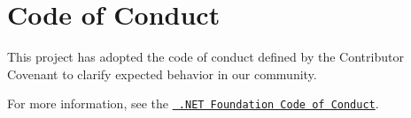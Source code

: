 \chapter{Code of Conduct}
\hypertarget{md__c_o_d_e-_o_f-_c_o_n_d_u_c_t}{}\label{md__c_o_d_e-_o_f-_c_o_n_d_u_c_t}
\label{md__c_o_d_e-_o_f-_c_o_n_d_u_c_t_autotoc_md0}%
%


This project has adopted the code of conduct defined by the Contributor Covenant to clarify expected behavior in our community.

For more information, see the \href{https://dotnetfoundation.org/code-of-conduct}{\texttt{ .NET Foundation Code of Conduct}}. 